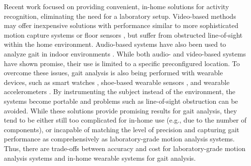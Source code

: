 \documentclass[12pt]{report}
\begin{document}
Recent work focused on providing convenient, in-home solutions for activity recognition, eliminating the need for a laboratory setup. Video-based methods may offer inexpensive solutions with performance similar to more sophisticated motion capture systems or floor sensors \cite{Wang2013TowardAdults}, but suffer from obstructed line-of-sight within the home environment. Audio-based systems have also been used to analyze gait in indoor environments \cite{Geiger2013Gait-basedFeatures, Altaf2015AcousticSounds}. While both audio- and video-based systems have shown promise, their use is limited to a specific preconfigured location. To overcome these issues, gait analysis is also being performed with wearable devices, such as smart watches \cite{Suh2016Kalman-Filter-BasedSmart-Watch}, shoe-based wearable sensors \cite{Mariani2013On-shoeDisease}, and wearable accelerometers \cite{Fortune2014ValidityVelocities, Hartmann2009ConcurrentAdults, DelDin2016ValidationUse, Chung2012GaitAccelerometer}. By instrumenting the subject instead of the environment, the systems become portable and problems such as line-of-sight obstruction can be avoided. While these solutions provide promising results for gait analysis, they tend to be either still too complicated for in-home use (e.g., due to the number of components), or incapable of matching the level of precision and capturing gait performance as comprehensively as  laboratory-grade motion analysis systems. Thus, there are trade-offs between accuracy and cost for laboratory-grade motion analysis systems and in-home wearable systems for gait analysis.
\end{document}
